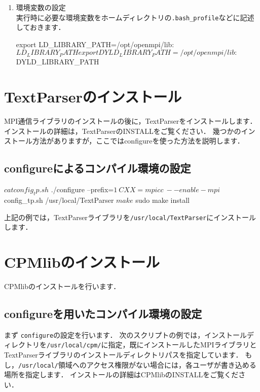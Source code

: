 \begin{enumerate}
{\small
{}
}

\item 環境変数の設定\\
実行時に必要な環境変数をホームディレクトリの\verb|.bash_profile|などに記述しておきます．

{\small
\begin{program}
export LD_LIBRARY_PATH=/opt/openmpi/lib:$LD_LIBRARY_PATH
export DYLD_LIBRARY_PATH=/opt/openmpi/lib:$DYLD_LIBRARY_PATH
\end{program}
}

\end{enumerate}



%
\section{TextParserのインストール}

MPI通信ライブラリのインストールの後に，TextParserをインストールします．
インストールの詳細は，TextParserのINSTALLをご覧ください．
幾つかのインストール方法がありますが，ここではconfigureを使った方法を説明します．

%
\subsection{configureによるコンパイル環境の設定}

{\small
\begin{program}
$ cat config_tp.sh
$ ./configure --prefix=$1 \
              CXX=mpicc \
	      --enable-mpi
	    
$ config_tp.sh /usr/local/TextParser
$ make
$ sudo make install
\end{program}
}

上記の例では，TextParserライブラリを\verb|/usr/local/TextParser|にインストールします．



%
\section{CPMlibのインストール}

CPMlibのインストールを行います．

%
\subsection{configureを用いたコンパイル環境の設定}
まず \verb|configure|の設定を行います．
次のスクリプトの例では，インストールディレクトリを\verb|/usr/local/cpm/|に指定，既にインストールしたMPIライブラリとTextParserライブラリのインストールディレクトリパスを指定しています．
もし，\verb|/usr/local/|領域へのアクセス権限がない場合には，各ユーザが書き込める場所を指定します．
インストールの詳細はCPMlibのINSTALLをご覧ください．

